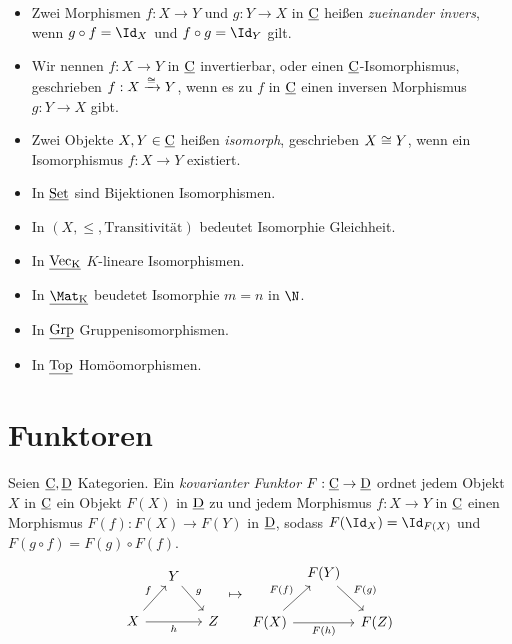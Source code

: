 \begin{df}
	\begin{itemize}
		\item
			Zwei Morphismen $f: X \to Y$ und $g: Y \to X$ in $\underline{\mathrm{C}}$ heißen \emph{zueinander invers}, wenn $g \circ f = \Id_X$ und $f \circ g = \Id_Y$ gilt.
		\item
			Wir nennen $f: X \to Y$ in $\underline{\mathrm{C}}$ invertierbar, oder einen $\underline{\mathrm{C}}$-Isomorphismus, geschrieben $f: X \xrightarrow{\cong} Y$, wenn es zu $f$ in $\underline{\mathrm{C}}$ einen inversen Morphismus $g: Y \to X$ gibt.
		\item
			Zwei Objekte $X, Y \in \underline{\mathrm{C}}$ heißen \emph{isomorph}, geschrieben $X \cong Y$, wenn ein Isomorphismus $f: X \to Y$ existiert.
	\end{itemize}
\end{df}

\begin{ex}
	\begin{itemize}
		\item
			In $\underline{\mathrm{Set}}$ sind Bijektionen Isomorphismen.
		\item
			In $(X, \le, \text{Transitivität})$ bedeutet Isomorphie Gleichheit.
		\item
			In $\underline{\mathrm{\operatorname{Vec}_K}}$ $K$-lineare Isomorphismen.
		\item
			In $\Cat{\Mat_K}$ beudetet Isomorphie $m = n$ in $\N$.
		\item
			In $\underline{\mathrm{Grp}}$ Gruppenisomorphismen.
		\item
			In $\underline{\mathrm{Top}}$ Homöomorphismen.
	\end{itemize}
\end{ex}


\section{Funktoren}


\begin{df}
	Seien $\underline{\mathrm{C}}, \underline{\mathrm{D}}$ Kategorien.
	Ein \emph{kovarianter Funktor} $F: \underline{\mathrm{C}} \to \underline{\mathrm{D}}$ ordnet jedem Objekt $X$ in $\underline{\mathrm{C}}$ ein Objekt $F(X)$ in $\underline{\mathrm{D}}$ zu und jedem Morphismus $f: X \to Y$ in $\underline{\mathrm{C}}$ einen Morphismus $F(f) : F(X) \to F(Y)$ in $\underline{\mathrm{D}}$, sodass $F(\Id_X) = \Id_{F(X)}$ und $F(g\circ f) = F(g) \circ F(f)$.
	\[
		\begin{tikzcd}[column sep=small]
			~ & Y \arrow{dr}{g} & \\
			X \arrow{ur}{f} \arrow{rr}[swap]{h} & & Z
		\end{tikzcd}
		\mapsto
		\begin{tikzcd}[column sep=tiny]
			~ & F(Y) \arrow{dr}{F(g)} & \\
			F(X) \arrow{ur}{F(f)} \arrow{rr}[swap]{F(h)} & & F(Z)
		\end{tikzcd}
	\]
\end{df}


